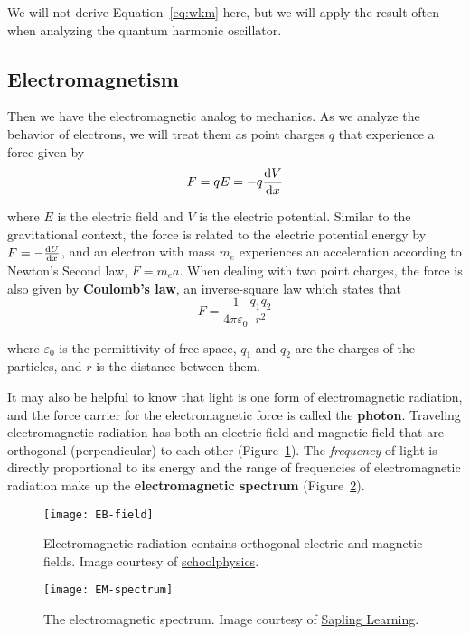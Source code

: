 We will not derive Equation~\ref{eq:wkm} here, but we will apply the result often when analyzing the quantum harmonic oscillator.


\subsection{Electromagnetism}
Then we have the electromagnetic analog to mechanics. As we analyze the behavior of electrons, we will treat them as point charges $q$ that experience a force given by 
\begin{equation*}
	F = qE = -q\dv{V}{x}
\end{equation*}

where $E$ is the electric field and $V$ is the electric potential. Similar to the gravitational context, the force is related to the electric potential energy by $F = -\dv{U}{x}$, and an electron with mass $m_e$ experiences an acceleration according to Newton's Second law, $F = m_ea$. When dealing with two point charges, the force is also given by \textbf{Coulomb's law}, an inverse-square law which states that
\begin{equation*}
	F = \frac{1}{4\pi \varepsilon_0} \frac{q_1q_2}{r^2}
\end{equation*}

where $\varepsilon_0$ is the permittivity of free space, $q_1$ and $q_2$ are the charges of the particles, and $r$ is the distance between them. \par 

It may also be helpful to know that light is one form of electromagnetic radiation, and the force carrier for the electromagnetic force is called the \textbf{photon}. Traveling electromagnetic radiation has both an electric field and magnetic field that are orthogonal (perpendicular) to each other (Figure~\ref{fig:EB-field}). The \emph{frequency} of light is directly proportional to its energy and the range of frequencies of electromagnetic radiation make up the \textbf{electromagnetic spectrum} (Figure~\ref{fig:EM-spec}).

\begin{figure}[!h]
	\centering
	\texttt{[image: EB-field]}
	\caption{Electromagnetic radiation contains orthogonal electric and magnetic fields. Image courtesy of \href{http://www.schoolphysics.co.uk/age16-19/Wave\%20properties/Polarisation/text/Polarisation_/images/2.png}{schoolphysics}.}
	\label{fig:EB-field}
\end{figure}

\begin{figure}[!h]
	\centering
	\texttt{[image: EM-spectrum]}
	\caption{The electromagnetic spectrum. Image courtesy of \href{https://sites.google.com/site/chempendix/em-spectrum}{Sapling Learning}.}
	\label{fig:EM-spec}
\end{figure}

%